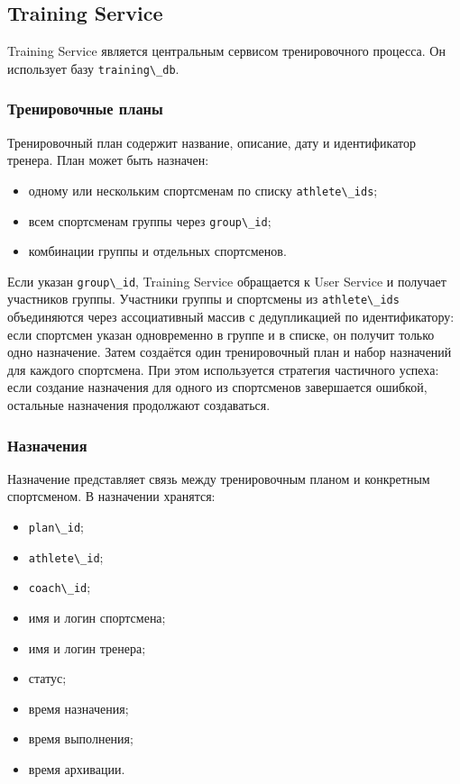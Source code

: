 \subsection{Training Service}

Training Service является центральным сервисом тренировочного процесса. Он использует базу \passthrough{\lstinline!training\_db!}.

\subsubsection{Тренировочные планы}

Тренировочный план содержит название, описание, дату и идентификатор тренера. План может быть назначен:

\begin{itemize}
\tightlist
\item
  одному или нескольким спортсменам по списку \passthrough{\lstinline!athlete\_ids!};
\item
  всем спортсменам группы через \passthrough{\lstinline!group\_id!};
\item
  комбинации группы и отдельных спортсменов.
\end{itemize}

Если указан \passthrough{\lstinline!group\_id!}, Training Service обращается к User Service и получает участников группы. Участники группы и спортсмены из \passthrough{\lstinline!athlete\_ids!} объединяются через ассоциативный массив с дедупликацией по идентификатору: если спортсмен указан одновременно в группе и в списке, он получит только одно назначение. Затем создаётся один тренировочный план и набор назначений для каждого спортсмена. При этом используется стратегия частичного успеха: если создание назначения для одного из спортсменов завершается ошибкой, остальные назначения продолжают создаваться.

\subsubsection{Назначения}

Назначение представляет связь между тренировочным планом и конкретным спортсменом. В назначении хранятся:

\begin{itemize}
\tightlist
\item
  \passthrough{\lstinline!plan\_id!};
\item
  \passthrough{\lstinline!athlete\_id!};
\item
  \passthrough{\lstinline!coach\_id!};
\item
  имя и логин спортсмена;
\item
  имя и логин тренера;
\item
  статус;
\item
  время назначения;
\item
  время выполнения;
\item
  время архивации.
\end{itemize}

